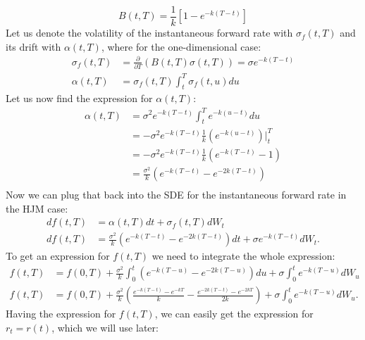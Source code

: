 \documentclass[titlepage, 12pt]{article}
\begin{document}
	\begin{equation}
		B(t, T)=\frac{1}{k}\left[1-e^{-k(T-t)}\right]
	\end{equation}
	Let us denote the volatility of the instantaneous forward rate with $\sigma_f(t,T)$ and its drift with $\alpha(t,T)$, where for the one-dimensional case:
	\begin{equation}
		\begin{split}
			\sigma_f(t,T)&= \frac{\partial}{\partial T}(B(t,T)\sigma(t,T)) = \sigma e^{-k(T-t)} \\
			\alpha(t,T) &= \sigma_f(t,T)\int_t^T\sigma_f(t,u)du
		\end{split}
	\end{equation}
	Let us now find the expression for $\alpha(t,T)$:
	\begin{equation}
		\begin{split}
			\alpha(t,T) &= \sigma^2e^{-k(T-t)}\int_t^Te^{-k(u-t)}du \\
			&= -\sigma^2e^{-k(T-t)}\frac{1}{k}\left(e^{-k(u-t)}\right)\bigg|_t^T \\
			&= -\sigma^2e^{-k(T-t)}\frac{1}{k}(e^{-k(T-t)} - 1) \\
			&= \frac{\sigma^2}{k}(e^{-k(T-t)}-e^{-2k(T-t)}) \\
		\end{split}
	\end{equation}
	Now we can plug that back into the SDE for the instantaneous forward rate in the HJM case:
	\begin{equation}
		\begin{split}
			df(t,T) &= \alpha(t,T)dt + \sigma_f(t,T)dW_t \\
			df(t,T) &= \frac{\sigma^2}{k}(e^{-k(T-t)}-e^{-2k(T-t)}) dt + \sigma e^{-k(T-t)} dW_t.
		\end{split}
	\end{equation}
	To get an expression for $f(t,T)$ we need to integrate the whole expression:
	\begin{equation}\label{eq:inst_fwd}
		\begin{split}
			f(t,T) &= f(0,T) + \frac{\sigma^2}{k}\int_0^t(e^{-k(T-u)}-e^{-2k(T-u)}) du + \sigma \int_0^t e^{-k(T-u)} dW_u \\
			f(t,T) &= f(0,T) + \frac{\sigma^2}{k} \left( \frac{e^{-k(T-t)} - e^{-kT}}{k} - \frac{e^{-2k(T-t)} - e^{-2kT}}{2k} \right) + \sigma \int_0^t e^{-k(T-u)} dW_u.
		\end{split}
	\end{equation}
	Having the expression for $f(t,T)$, we can easily get the expression for $r_t=r(t)$, which we will use later:
\end{document}
